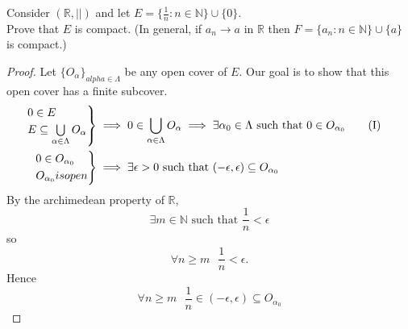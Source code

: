 \documentclass[a4paper]{article}
\begin{document}
	\begin{example}
		Consider $( \mathbb{R} , | |)$ and let $E=\{ \frac{1}{n} : n \in \mathbb{N} \} \cup \{0\}$. \\
		Prove that $E$ is compact. (In general, if $a_n \rightarrow a$ in $\mathbb{R}$ then $F=\{a_n : n \in \mathbb{N} \} \cup \{a\}$ is compact.)
	\end{example}
	\begin{proof}
		\label{prf:proof_3}
		Let $\{O_\alpha\}_{alpha\in \Lambda}$ be any open cover of $E$. Our goal is to show that this open cover has a finite subcover.
		\begin{align*}
			\begin{rcases}
				0 \in E \\
				E \subseteq \bigcup \limits_{\alpha \in \Lambda} O_\alpha
			\end{rcases}
			&\implies 0\in \bigcup \limits_{\alpha \in \Lambda} O_\alpha \implies \exists \alpha_0 \in \Lambda \text{ such that } 0 \in O_{\alpha_0}  \tag{I} \\
			\begin{rcases}
				0 \in O_{\alpha_0} \\
				O_{\alpha_0} is open
			\end{rcases}
			&\implies \exists \epsilon > 0 \text{ such that } (-\epsilon, \epsilon) \subseteq O_{\alpha_0}
		\end{align*}
		By the archimedean property of $\mathbb{R}$,
		$$ \exists m \in \mathbb{N} \text{ such that } \frac{1}{n} < \epsilon$$
		so
		$$\forall n \geq m ~~~ \frac{1}{n} < \epsilon.$$
		Hence
		\begin{equation}
			\forall n \geq m ~~~ \frac{1}{n} \in (-\epsilon, \epsilon) \subseteq O_{\alpha_0} \tag{II}
		\end{equation}
	\end{proof}
\end{document}
